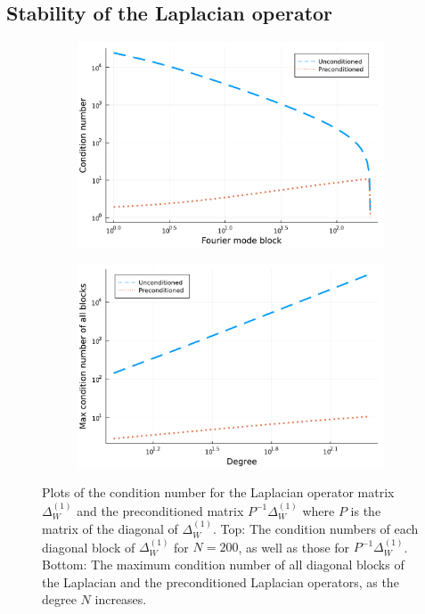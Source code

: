 \documentclass[11pt, oneside]{article}   	%
\begin{document}
\subsection{Stability of the Laplacian operator}

\begin{figure}[tp]
	\centering
	\begin{subfigure}[b]{0.55\textwidth}
		\includegraphics[scale=0.4]{condition-numbers-laplacian-log-N=200}
	\end{subfigure}
	\hfill%
	
	\begin{subfigure}[b]{0.55\textwidth}
		\includegraphics[scale=0.4]{condition-numbers-max-laplacian-log}
	\end{subfigure}
	\hfill%
	\caption{Plots of the condition number for the Laplacian operator matrix $\Delta^{(1)}_W$ and the preconditioned matrix $P^{-1} \Delta^{(1)}_W$ where $P$ is the matrix of the diagonal of $\Delta^{(1)}_W$. Top: The condition numbers of each diagonal block of $\Delta^{(1)}_W$ for $N = 200$, as well as those for $P^{-1} \Delta^{(1)}_W$. Bottom: The maximum condition number of all diagonal blocks of the Laplacian and the preconditioned Laplacian operators, as the degree $N$ increases.}
	\label{fig:conditionnumbers}
\end{figure}
\end{document}
